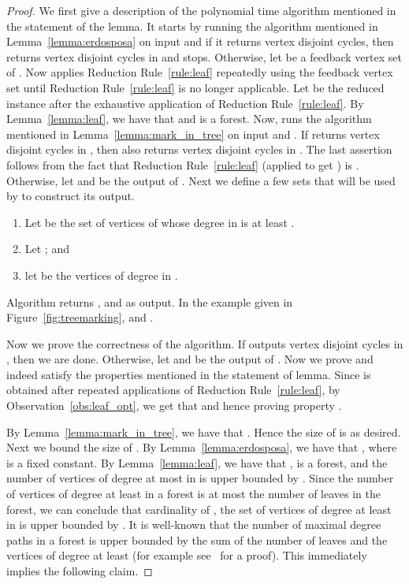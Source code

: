 \begin{proof}
We first give a description of the polynomial time algorithm  mentioned in the statement of the lemma. 
It starts by running  the algorithm mentioned in Lemma~\ref{lemma:erdosposa} on input  and if it returns  vertex disjoint cycles,  then  returns 
 vertex disjoint cycles in  
and stops. Otherwise, let  be a 
feedback vertex set of . 
Now   applies Reduction Rule~\ref{rule:leaf} repeatedly using the feedback vertex set  until 
Reduction Rule~\ref{rule:leaf} is no longer applicable. Let  be the reduced instance after the exhaustive application of 
Reduction Rule~\ref{rule:leaf}. By Lemma~\ref{lemma:leaf}, we have that  and  is a forest. 
Now,   runs the algorithm  mentioned in Lemma~\ref{lemma:mark_in_tree} on input  and . If  
returns  vertex disjoint cycles in , then  also returns  vertex disjoint cycles in . The last assertion follows from the fact that  Reduction Rule~\ref{rule:leaf} (applied to get ) is \onesafe. 
Otherwise, let  and  be the output of . Next we define a 
few sets that will be used by  to construct its output.
\begin{enumerate}
\setlength{\itemsep}{-2pt}
\item Let  be the set 
of vertices of  whose  degree in  is at least . 
\item Let ; and 
\item let  be the vertices of degree  in . 
\end{enumerate}
Algorithm  returns ,  and 
 as output. In the example given in Figure~\ref{fig:treemarking},  and .

Now we prove the correctness of the algorithm. If  outputs  vertex disjoint  cycles in , then we are done. Otherwise, let  and  be the output of . 
Now we prove  and   indeed satisfy the properties mentioned in the statement of lemma.
Since  is obtained after repeated applications of Reduction Rule~\ref{rule:leaf}, by Observation~\ref{obs:leaf_opt}, we get 
that  and hence proving property .  


By Lemma~\ref{lemma:mark_in_tree}, 
we have that . Hence the size of  is as desired. 
Next we bound the size of .  
By  Lemma~\ref{lemma:erdosposa}, we have that , where  is a fixed constant.   
By Lemma~\ref{lemma:leaf}, we have that ,  is a forest, and 
the number of vertices of  degree at most  in  is upper bounded by . 
Since the number of vertices of degree at least  in a forest is at most the number of leaves in the forest, we can conclude 
that cardinality of , the set of vertices of degree at least  in  is upper bounded by . It is well-known that the number of maximal degree  paths in a forest is  upper bounded by the sum of the number of leaves and the vertices of degree at least  
(for example see~\cite{RamanSS06} for a proof). This immediately implies the following claim. 


\end{proof}
